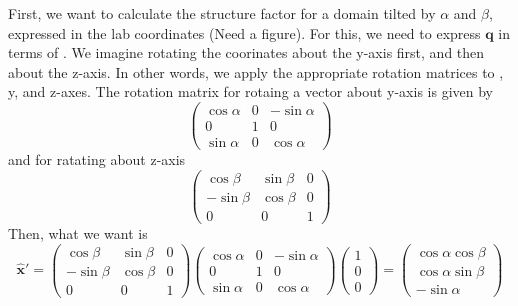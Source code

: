 First, we want to calculate the structure factor for a domain tilted by 
$\alpha$ and $\beta$, expressed in the lab coordinates (Need a figure). 
For this, we need to express
$\mathbf{q}$ in terms of . We imagine
rotating the coorinates about the y-axis first, and then about the z-axis. In
other words, we apply the appropriate rotation matrices to , y, and 
z-axes. The rotation matrix for rotaing a vector about y-axis is given by
\begin{equation}
  \begin{pmatrix} 
    \cos\alpha & 0 & -\sin\alpha \\ 
    0 & 1 & 0 \\
    \sin\alpha & 0 & \cos\alpha 
  \end{pmatrix}
\end{equation}
and for ratating about z-axis
\begin{equation}
  \begin{pmatrix} 
    \cos\beta & \sin\beta & 0 \\ 
    -\sin\beta & \cos\beta & 0 \\
    0 & 0 & 1 
  \end{pmatrix}
\end{equation}
Then, what we want is
\begin{equation}
  \mathbf{\hat{x}}' = 
  \begin{pmatrix} 
    \cos\beta & \sin\beta & 0 \\ 
    -\sin\beta & \cos\beta & 0 \\
    0 & 0 & 1 
  \end{pmatrix}
  \begin{pmatrix} 
    \cos\alpha & 0 & -\sin\alpha \\ 
    0 & 1 & 0 \\
    \sin\alpha & 0 & \cos\alpha 
  \end{pmatrix}
  \begin{pmatrix}
    1 \\
    0 \\
    0
  \end{pmatrix}
  = 
  \begin{pmatrix}
    \cos\alpha\cos\beta \\
    \cos\alpha\sin\beta \\
    -\sin\alpha
  \end{pmatrix}
\end{equation}
